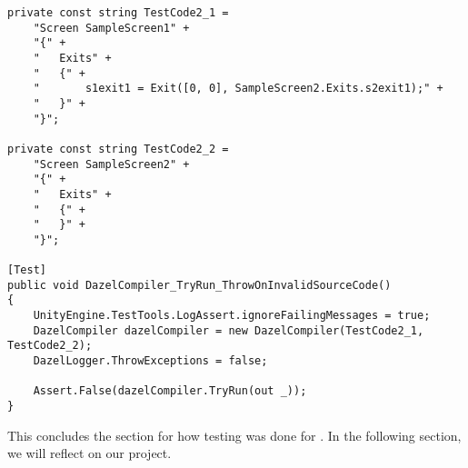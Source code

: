 \begin{lstlisting}[language=CSharp, caption={\dazel{} compiler integration test verifying that invalid source code results in an error}, label={lst:integrationTest2}, escapechar=|]
private const string TestCode2_1 =
    "Screen SampleScreen1" +
    "{" +
    "   Exits" +
    "   {" +
    "       s1exit1 = Exit([0, 0], SampleScreen2.Exits.s2exit1);" + 
    "   }" +
    "}";

private const string TestCode2_2 = 
    "Screen SampleScreen2" +
    "{" +
    "   Exits" +
    "   {" +
    "   }" +
    "}";

[Test]
public void DazelCompiler_TryRun_ThrowOnInvalidSourceCode()
{
    UnityEngine.TestTools.LogAssert.ignoreFailingMessages = true;
    DazelCompiler dazelCompiler = new DazelCompiler(TestCode2_1, TestCode2_2);
    DazelLogger.ThrowExceptions = false;
    
    Assert.False(dazelCompiler.TryRun(out _));
}
\end{lstlisting}

This concludes the section for how testing was done for \dazel{}. In the following section, we will reflect on our project.
